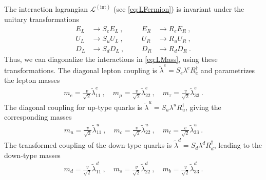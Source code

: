 The interaction lagrangian $\mathcal{L}^{(\text{int})}$ (see \eqref{eq:LFermion}) is invariant under the unitary transformations
\begin{align*}
	E_L &\rightarrow S_eE_L \ , && &E_R &\rightarrow R_eE_R \ , \\
	U_L &\rightarrow S_uU_L \ , && &U_R &\rightarrow R_uU_R \ , \\
	D_L &\rightarrow S_dD_L \ , && &D_R &\rightarrow R_dD_R \ .
\end{align*}
Thus, we can diagonalize the interactions in \eqref{eq:LMass}, using these transformations. The diagonal lepton coupling is $\tilde{\lambda}^e = S_e\lambda^eR_e^\dagger$ and parametrizes the lepton masses
\begin{align*}
	m_e = \frac{v}{\sqrt{2}}\tilde{\lambda}_{11}^e \ , \quad m_\mu = \frac{v}{\sqrt{2}}\tilde{\lambda}_{22}^e \ , \quad m_\tau = \frac{v}{\sqrt{2}}\tilde{\lambda}_{33}^e \ .
\end{align*}
The diagonal coupling for up-type quarks is $\tilde{\lambda}^u = S_u\lambda^uR_u^\dagger$, giving the corresponding masses
\begin{align*}
	m_u = \frac{v}{\sqrt{2}}\tilde{\lambda}_{11}^u \ , \quad m_c = \frac{v}{\sqrt{2}}\tilde{\lambda}_{22}^u \ , \quad m_t = \frac{v}{\sqrt{2}}\tilde{\lambda}_{33}^u \ .
\end{align*}
The transformed coupling of the down-type quarks is $\tilde{\lambda}^d = S_d\lambda^dR_d^\dagger$, leading to the down-type masses
\begin{align*}
	m_d = \frac{v}{\sqrt{2}}\tilde{\lambda}_{11}^d \ , \quad m_s = \frac{v}{\sqrt{2}}\tilde{\lambda}_{22}^d \ , \quad m_b = \frac{v}{\sqrt{2}}\tilde{\lambda}_{33}^d \ .
\end{align*}


